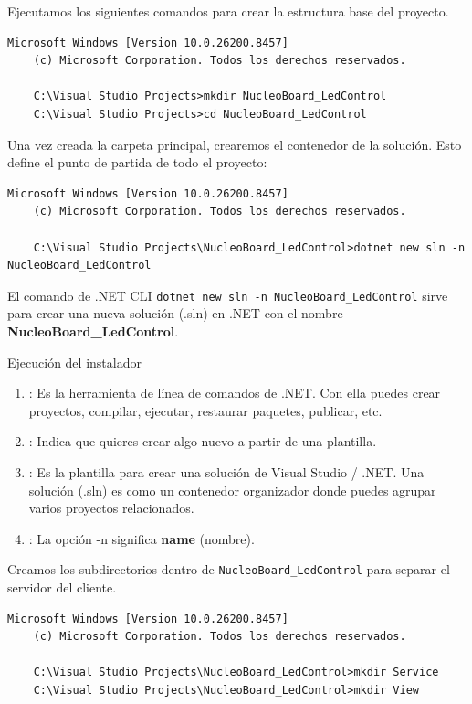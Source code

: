 \documentclass[
10pt, %
a4paper, %
oneside, %
headinclude,footinclude, %
BCOR5mm, %
]{scrartcl}
\begin{document}
Ejecutamos los siguientes comandos para crear la estructura base del proyecto.
\begin{lstlisting}[language=DOS]
	Microsoft Windows [Version 10.0.26200.8457]
	(c) Microsoft Corporation. Todos los derechos reservados.
	
	C:\Visual Studio Projects>mkdir NucleoBoard_LedControl
	C:\Visual Studio Projects>cd NucleoBoard_LedControl
\end{lstlisting}

Una vez creada la carpeta principal, crearemos el contenedor de la solución. Esto define el punto de partida de todo el proyecto:
\begin{lstlisting}[language=DOS]
	Microsoft Windows [Version 10.0.26200.8457]
	(c) Microsoft Corporation. Todos los derechos reservados.
	
	C:\Visual Studio Projects\NucleoBoard_LedControl>dotnet new sln -n NucleoBoard_LedControl
\end{lstlisting}

El comando de .NET CLI \texttt{dotnet new sln -n NucleoBoard\_LedControl} sirve para crear una nueva solución (.sln) en .NET con el nombre \textbf{NucleoBoard\_LedControl}.

\begin{InfoBox}{Ejecución del instalador} 
\begin{enumerate}
	\item {}: Es la herramienta de línea de comandos de .NET. Con ella puedes crear proyectos, compilar, ejecutar, restaurar paquetes, publicar, etc.
	\item {}: Indica que quieres crear algo nuevo a partir de una plantilla.
	\item {}: Es la plantilla para crear una solución de Visual Studio / .NET. Una solución (.sln) es como un contenedor organizador donde puedes agrupar varios proyectos relacionados.
	\item {}: La opción -n significa \textbf{name} (nombre).
\end{enumerate}
\end{InfoBox}


Creamos los subdirectorios dentro de \texttt{NucleoBoard\_LedControl} para separar el servidor del cliente.
\begin{lstlisting}[language=DOS]
	Microsoft Windows [Version 10.0.26200.8457]
	(c) Microsoft Corporation. Todos los derechos reservados.
	
	C:\Visual Studio Projects\NucleoBoard_LedControl>mkdir Service
	C:\Visual Studio Projects\NucleoBoard_LedControl>mkdir View
\end{lstlisting}
\end{document}
